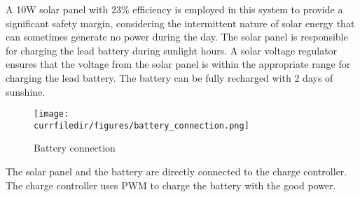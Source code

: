 A 10W solar panel with 23\% efficiency is employed in this system to provide a significant safety margin, considering the intermittent nature of solar energy that can sometimes generate no power during the day. The solar panel is responsible for charging the lead battery during sunlight hours. A solar voltage regulator ensures that the voltage from the solar panel is within the appropriate range for charging the lead battery. The battery can be fully recharged with 2 days of sunshine.


\begin{figure}[!h]
    \centering
    \texttt{[image: \\currfiledir/figures/battery\_connection.png]}
    \caption{Battery connection}
    \cite{battery}
\end{figure}

The solar panel and the battery are directly connected to the charge controller. The charge controller uses PWM to charge the battery with the good power.